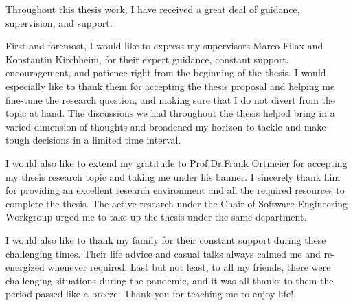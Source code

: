 \documentclass[
]{thesis}
\begin{document}
Throughout this thesis work, I have received a great deal of guidance, supervision, and support.

First and foremost, I would like to express my supervisors Marco Filax and Konstantin Kirchheim,
for their expert guidance, constant support, encouragement, and patience right from the beginning of the thesis.
I would especially like to thank them for accepting the thesis proposal and helping me fine-tune the research question,
and making sure that I do not divert from the topic at hand.
The discussions we had throughout the thesis helped bring in a varied dimension of thoughts and broadened my horizon to tackle and make tough decisions in a limited time interval.

I would also like to extend my gratitude to Prof.Dr.Frank Ortmeier for accepting my thesis research topic and taking me under his banner.
I sincerely thank him for providing an excellent research environment and all the required resources to complete the thesis.
The active research under the Chair of Software Engineering Workgroup urged me to take up the thesis under the same department.

I would also like to thank my family for their constant support during these challenging times.
Their life advice and casual talks always calmed me and re-energized whenever required.
Last but not least, to all my friends, there were challenging situations during the pandemic, and it was all thanks to them the period passed like a breeze.
Thank you for teaching me to enjoy life!

\blankpage
{\parskip 0pt \pdfbookmark{\contentsname}{\contentsname}\chapterheadfont \tableofcontents}
\blankpage
\listoffigures
\listoftables
\glsaddall[types={symbol}]
\printglossary[type=acronym,
    title=\iftoggle{german}{Abkürzungsverzeichnis}{List of Acronyms},
    toctitle=\iftoggle{german}{Abkürzungsverzeichnis}{List of Acronyms}]
\printglossary[type=symbol,style=supergroup]

\mainmatter
{}






\appendix

\cleardoublepage
{}


\end{document}
